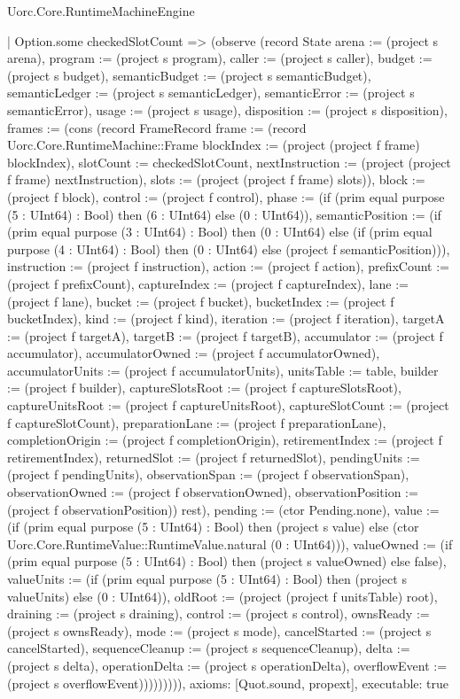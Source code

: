 \begin{lexlean}{Uorc.Core.RuntimeMachineEngine}
\begin{semanticmodule}
{      | Option.some checkedSlotCount => (observe (record State {arena := (project s arena), program := (project s program), caller := (project s caller), budget := (project s budget), semanticBudget := (project s semanticBudget), semanticLedger := (project s semanticLedger), semanticError := (project s semanticError), usage := (project s usage), disposition := (project s disposition), frames := (cons (record FrameRecord {frame := (record Uorc.Core.RuntimeMachine::Frame {blockIndex := (project (project f frame) blockIndex), slotCount := checkedSlotCount, nextInstruction := (project (project f frame) nextInstruction), slots := (project (project f frame) slots)}), block := (project f block), control := (project f control), phase := (if (prim equal purpose (5 : UInt64) : Bool) then (6 : UInt64) else (0 : UInt64)), semanticPosition := (if (prim equal purpose (3 : UInt64) : Bool) then (0 : UInt64) else (if (prim equal purpose (4 : UInt64) : Bool) then (0 : UInt64) else (project f semanticPosition))), instruction := (project f instruction), action := (project f action), prefixCount := (project f prefixCount), captureIndex := (project f captureIndex), lane := (project f lane), bucket := (project f bucket), bucketIndex := (project f bucketIndex), kind := (project f kind), iteration := (project f iteration), targetA := (project f targetA), targetB := (project f targetB), accumulator := (project f accumulator), accumulatorOwned := (project f accumulatorOwned), accumulatorUnits := (project f accumulatorUnits), unitsTable := table, builder := (project f builder), captureSlotsRoot := (project f captureSlotsRoot), captureUnitsRoot := (project f captureUnitsRoot), captureSlotCount := (project f captureSlotCount), preparationLane := (project f preparationLane), completionOrigin := (project f completionOrigin), retirementIndex := (project f retirementIndex), returnedSlot := (project f returnedSlot), pendingUnits := (project f pendingUnits), observationSpan := (project f observationSpan), observationOwned := (project f observationOwned), observationPosition := (project f observationPosition)}) rest), pending := (ctor Pending.none), value := (if (prim equal purpose (5 : UInt64) : Bool) then (project s value) else (ctor Uorc.Core.RuntimeValue::RuntimeValue.natural (0 : UInt64))), valueOwned := (if (prim equal purpose (5 : UInt64) : Bool) then (project s valueOwned) else false), valueUnits := (if (prim equal purpose (5 : UInt64) : Bool) then (project s valueUnits) else (0 : UInt64)), oldRoot := (project (project f unitsTable) root), draining := (project s draining), control := (project s control), ownsReady := (project s ownsReady), mode := (project s mode), cancelStarted := (project s cancelStarted), sequenceCleanup := (project s sequenceCleanup), delta := (project s delta), operationDelta := (project s operationDelta), overflowEvent := (project s overflowEvent)})))))))),
  axioms: [Quot.sound, propext],
  executable: true
}


\end{semanticmodule}
\end{lexlean}
